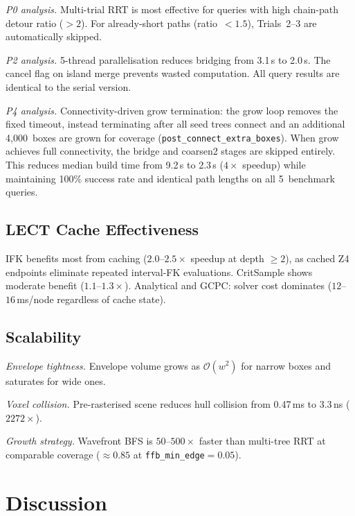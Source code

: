 \documentclass[journal]{IEEEtran}
\newcommand{\calO}{\mathcal{O}}
\begin{document}
\emph{P0 analysis.}
Multi-trial RRT is most effective for queries with high chain-path
detour ratio ($> 2$).
For already-short paths (ratio~$< 1.5$), Trials~2--3 are
automatically skipped.

\emph{P2 analysis.}
5-thread parallelisation reduces bridging from 3.1\,s to 2.0\,s.
The cancel flag on island merge prevents wasted computation.
All query results are identical to the serial version.

\emph{P4 analysis.}
Connectivity-driven grow termination: the grow loop removes the
fixed timeout, instead terminating after all seed trees connect and
an additional 4{,}000~boxes are grown for coverage
(\texttt{post\_connect\_extra\_boxes}).
When grow achieves full connectivity, the bridge and coarsen2
stages are skipped entirely.
This reduces median build time from 9.2\,s to 2.3\,s ($4{\times}$
speedup) while maintaining 100\% success rate and identical path
lengths on all 5~benchmark queries.

\subsection{LECT Cache Effectiveness}

IFK benefits most from caching ($2.0$--$2.5{\times}$ speedup
at depth $\geq 2$), as cached Z4 endpoints eliminate repeated
interval-FK evaluations.
CritSample shows moderate benefit ($1.1$--$1.3{\times}$).
Analytical and GCPC: solver cost dominates ($12$--$16\,$ms/node
regardless of cache state).

\subsection{Scalability}

\emph{Envelope tightness.}
Envelope volume grows as $\calO(w^2)$ for narrow boxes and saturates
for wide ones.

\emph{Voxel collision.}
Pre-rasterised scene reduces hull collision from 0.47\,ms to 3.3\,ns
($2272{\times}$).

\emph{Growth strategy.}
Wavefront BFS is $50$--$500{\times}$ faster than multi-tree RRT at
comparable coverage ($\approx 0.85$ at
\texttt{ffb\_min\_edge}${}=0.05$).

\section{Discussion}\label{sec:discussion}
\end{document}
